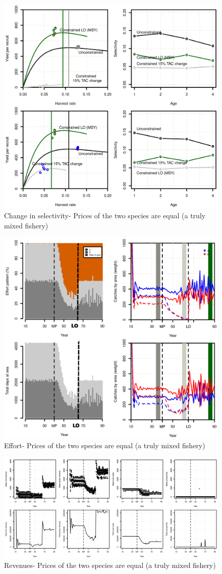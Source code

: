 \documentclass[12pt,oneline,a4paper,numbib]{ouparticle}
\numberwithin{equation}{subsection} %
\begin{document}
\begin{figure}[!ht]
\centering
\includegraphics[width=.69\textwidth]{Figures/figurecatches2.eps} 
\caption{Change in selectivity- Prices of the two species are equal (a truly mixed fishery)}
\end{figure}

\begin{figure}[!ht]
\centering
\includegraphics[width=.82\textwidth]{Figures/figureffort.eps} 
\caption{Effort- Prices of the two species are equal (a truly mixed fishery)}
\end{figure}

\begin{figure}[!ht]
\centering
\includegraphics[width=\textwidth]{Figures/figurerevenue.eps} 
\caption{Revenues- Prices of the two species are equal (a truly mixed fishery)}
\end{figure}
\end{document}
